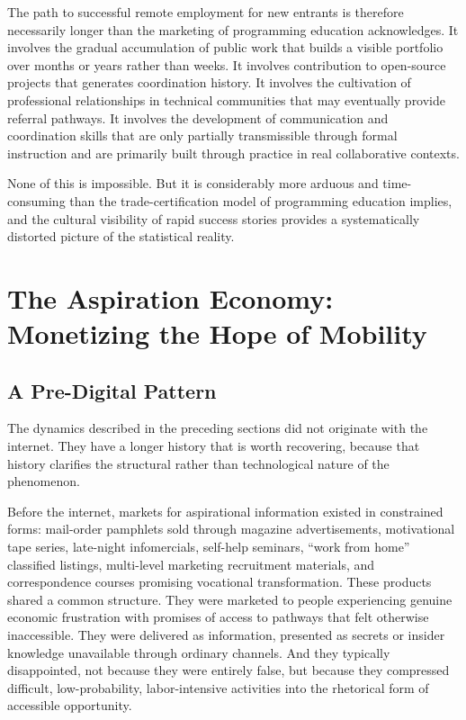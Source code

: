 \documentclass[12pt, a4paper]{article}
\theoremstyle{plain}
\theoremstyle{definition}
\theoremstyle{remark}
\begin{document}
The path to successful remote employment for new entrants
is therefore necessarily longer than the marketing of programming education
acknowledges.
It involves the gradual accumulation of public work that builds a visible portfolio
over months or years rather than weeks.
It involves contribution to open-source projects that generates coordination history.
It involves the cultivation of professional relationships in technical communities
that may eventually provide referral pathways.
It involves the development of communication and coordination skills
that are only partially transmissible through formal instruction
and are primarily built through practice in real collaborative contexts.

None of this is impossible.
But it is considerably more arduous and time-consuming than the
trade-certification model of programming education implies,
and the cultural visibility of rapid success stories
provides a systematically distorted picture of the statistical reality.

\section{The Aspiration Economy: Monetizing the Hope of Mobility}
\label{sec:aspiration}

\subsection{A Pre-Digital Pattern}

The dynamics described in the preceding sections did not originate with the internet.
They have a longer history that is worth recovering, because that history
clarifies the structural rather than technological nature of the phenomenon.

Before the internet, markets for aspirational information existed in constrained forms:
mail-order pamphlets sold through magazine advertisements,
motivational tape series, late-night infomercials, self-help seminars,
``work from home'' classified listings, multi-level marketing recruitment materials,
and correspondence courses promising vocational transformation.
These products shared a common structure.
They were marketed to people experiencing genuine economic frustration
with promises of access to pathways that felt otherwise inaccessible.
They were delivered as information, presented as secrets or insider knowledge
unavailable through ordinary channels.
And they typically disappointed, not because they were entirely false,
but because they compressed difficult, low-probability, labor-intensive activities
into the rhetorical form of accessible opportunity.
\end{document}

